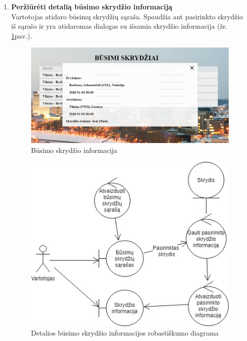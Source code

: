 \documentclass{VUMIFPSkursinis}
\begin{document}
\begin{enumerate}[label=\textbf{U\arabic*}.]
                    \item \textbf{Peržiūrėti detalią būsimo skrydžio informaciją}\\
                    Vartotojas atidaro būsimų skrydžių sąraša. Spaudžia ant pasirinkto skrydžio iš sąrašo ir yra atidaromas dialogas su išsamia skrydžio informacija (žr. \ref{upcoming_fligth_details}pav.).
                    \begin{figure}[H]	
                        \centering
                        \includegraphics[scale=0.6]{img/details}	
                        \caption{Būsimo skrydžio informacija}	
                        \label{upcoming_fligth_details}	
                    \end{figure}

                    \begin{figure}[H]
                        \centering
                        \includegraphics[scale=0.8]{img/ROBupcoming-flight-info}
                        \caption{Detalios būsimo skrydžio informacijos robastiškumo diagrama}
                        \label{home_page_one_way}
                    \end{figure}


\end{enumerate}
\end{document}
